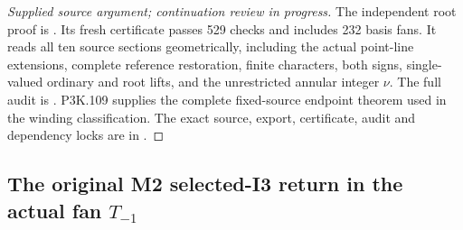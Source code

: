 \begin{proof}[Supplied source argument; continuation review in progress]
The independent root proof is
.
Its fresh certificate passes 529 checks and includes 232 basis fans.
It reads all ten source sections geometrically, including the actual
point-line extensions, complete reference restoration, finite
characters, both signs, single-valued ordinary and root lifts,
and the unrestricted annular integer \(\nu\).
The full audit is .
P3K.109 supplies the complete fixed-source endpoint theorem used in
the winding classification. The exact source, export, certificate,
audit and dependency locks are in
.


\end{proof}


\subsection{The original M2 selected-I3 return in the actual fan \texorpdfstring{\(T_{-1}\)}{T-1}}
